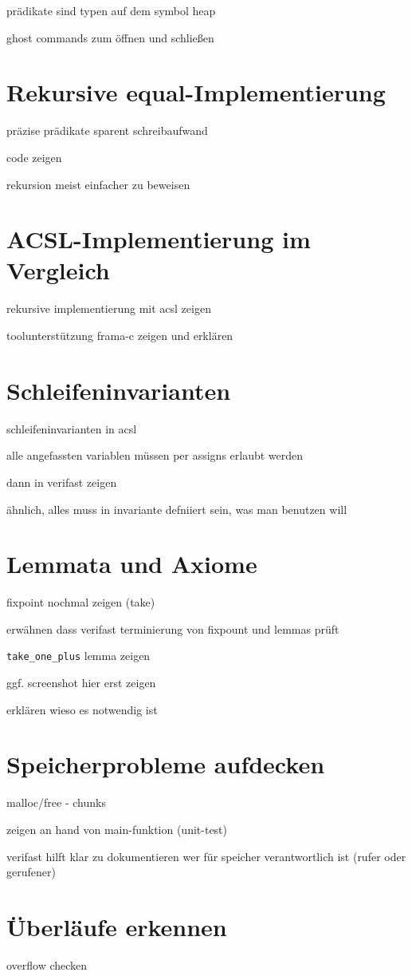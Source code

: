 prädikate sind typen auf dem symbol heap

ghost commands zum öffnen und schließen

\section{Rekursive equal-Implementierung}



präzise prädikate sparent schreibaufwand

code zeigen

rekursion meist einfacher zu beweisen

\section{ACSL-Implementierung im Vergleich}

rekursive implementierung mit acsl zeigen

toolunterstützung frama-c zeigen und erklären

\section{Schleifeninvarianten}

schleifeninvarianten in acsl

alle angefassten variablen müssen per assigns erlaubt werden

dann in verifast zeigen

ähnlich, alles muss in invariante defniiert sein, was man benutzen will

\section{Lemmata und Axiome}

fixpoint nochmal zeigen (take)

erwähnen dass verifast terminierung von fixpount und lemmas prüft

\lstinline{take_one_plus} lemma zeigen

ggf. screenshot hier erst zeigen

erklären wieso es notwendig ist

\section{Speicherprobleme aufdecken}

malloc/free - chunks

zeigen an hand von main-funktion (unit-test)

verifast hilft klar zu dokumentieren wer für speicher verantwortlich ist (rufer oder gerufener)

\section{Überläufe erkennen}

overflow checken
